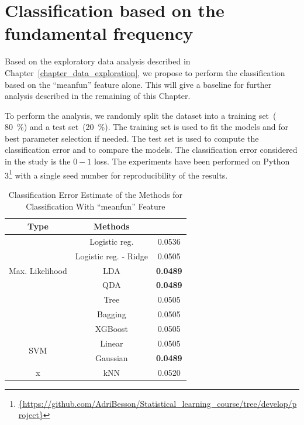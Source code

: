 \section{Classification based on the fundamental frequency}
\label{sec_intuitive_approach}
Based on the exploratory data analysis described in Chapter~\ref{chapter_data_exploration}, we propose to perform the classification based on the ``meanfun'' feature alone. 
This will give a baseline for further analysis described in the remaining of this Chapter.

To perform the analysis, we randomly split the dataset into a training set~( \SI{80}{\percent}) and a test set~(\SI{20}{\percent}). 
The training set is used to fit the models and for best parameter selection if needed. The test set is used to compute the classification error and to compare the models. The classification error considered in the study is the $0-1$ loss. 
The experiments have been performed on Python \num{3}\footnote{\url{{https://github.com/AdriBesson/Statistical_learning_course/tree/develop/project}}} with a single seed number for reproducibility of the results.
\begin{table}[htb]
	\caption{Classification Error Estimate of the Methods for Classification With ``meanfun'' Feature}
	\begin{center}
		\begin{tabular}{@{} c c c @{}}\toprule
			Type & Methods & \\
			\midrule
			\multirow{5}{*}{Max. Likelihood} & Logistic reg. & \num{0.0536} \\
			& Logistic reg. - Ridge & \num{0.0505}  \\
			& LDA & \textbf{\num{0.0489}} \\
			& QDA & \textbf{\num{0.0489}} \\
			\cmidrule{1-3}
			\multirow{3}{*}{Trees} & Tree & \num{0.0505} \\
			& Bagging & \num{0.0505} \\
			& XGBoost & \num{0.0505}\\
			\cmidrule{1-3}
			\multirow{2}{*}{SVM} & Linear & \num{0.0505} \\
			& Gaussian & \textbf{\num{0.0489}} \\
			\cmidrule{1-3}
			x & kNN & \num{0.0520}\\
			\bottomrule
		\end{tabular}
	\end{center}
	\label{tab_res_meanfun}
\end{table}

